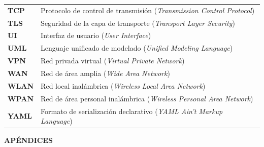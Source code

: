 \documentclass[a4paper, 12pt]{article}
\begin{document}
\begin{tabularx}{\textwidth}{@{}p{1.8cm} X@{}}
    \textbf{TCP} & Protocolo de control de transmisión (\textit{Transmission Control Protocol}) \\
    \textbf{TLS} & Seguridad de la capa de transporte (\textit{Transport Layer Security}) \\
    \textbf{UI} & Interfaz de usuario (\textit{User Interface}) \\
    \textbf{UML} & Lenguaje unificado de modelado (\textit{Unified Modeling Language}) \\
    \textbf{VPN} & Red privada virtual (\textit{Virtual Private Network}) \\
    \textbf{WAN} & Red de área amplia (\textit{Wide Area Network}) \\
    \textbf{WLAN} & Red local inalámbrica (\textit{Wireless Local Area Network}) \\
    \textbf{WPAN} & Red de área personal inalámbrica (\textit{Wireless Personal Area Network}) \\
    \textbf{YAML} & Formato de serialización declarativo (\textit{YAML Ain't Markup Language}) \\
\end{tabularx}


\newpage
\newpage

\pagestyle{cuerpo}
\thispagestyle{cuerpo}



















\newpage
 



\appendix
\clearpage
\addappheadtotoc
\vspace*{\fill}
\begin{center}
    \Huge \textbf{APÉNDICES}
\end{center}
\vspace*{\fill}
\clearpage


\end{document}
